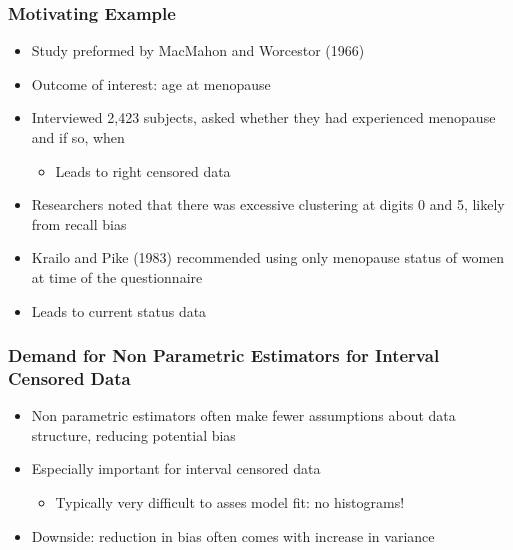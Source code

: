 \documentclass[compress,red]{beamer}
\begin{document}
\begin{frame}

	\frametitle{Motivating Example}

	\begin{itemize}
	
	\item Study preformed by MacMahon and Worcestor (1966)
	
	\item Outcome of interest: age at menopause
	
	\item Interviewed 2,423 subjects, asked whether they had experienced menopause and if so, when
	
		\begin{itemize}
		
		\item Leads to right censored data
		
		\end{itemize}
	
	\item Researchers noted that there was excessive clustering at digits 0 and 5, likely from recall bias
	
	\item Krailo and Pike (1983) recommended using only menopause status of women at time of the questionnaire
	
	\item Leads to current status data
		
	\end{itemize}

\end{frame}

\begin{frame}

\frametitle{Demand for Non Parametric Estimators for Interval Censored Data}

	\begin{itemize}
	
	\item Non parametric estimators often make fewer assumptions about data structure, reducing potential bias
	
	\item Especially important for interval censored data
	
		\begin{itemize}
		
		\item Typically very difficult to asses model fit: no histograms!
		
		\end{itemize}
	
	\item Downside: reduction in bias often comes with increase in variance
	
	\end{itemize}

\end{frame}
\end{document}
